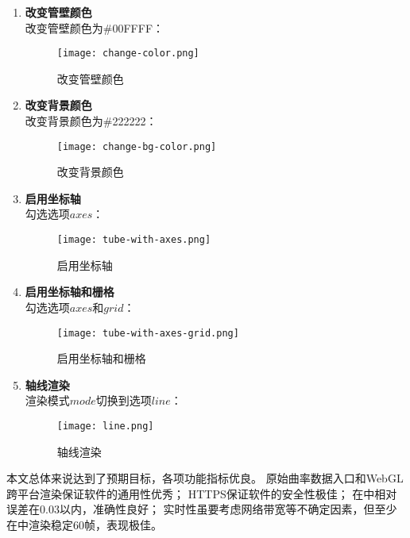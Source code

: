 \begin{enumerate}

\item \textbf{改变管壁颜色} \\
改变管壁颜色为\#00FFFF：
\begin{figure}[H]
\centering
\texttt{[image: change-color.png]}
\caption{改变管壁颜色}
\label{fig:change-color}
\end{figure}

\item \textbf{改变背景颜色} \\
改变背景颜色为\#222222：

\begin{figure}[H]
\centering
\texttt{[image: change-bg-color.png]}
\caption{改变背景颜色}
\label{fig:change-bg-color}
\end{figure}

\item \textbf{启用坐标轴} \\
勾选选项$axes$：

\begin{figure}[H]
\centering
\texttt{[image: tube-with-axes.png]}
\caption{启用坐标轴}
\label{fig:tube-with-axes}
\end{figure}

\item \textbf{启用坐标轴和栅格} \\
勾选选项$axes$和$grid$：

\begin{figure}[H]
\centering
\texttt{[image: tube-with-axes-grid.png]}
\caption{启用坐标轴和栅格}
\label{fig:tube-with-axes-grid}
\end{figure}

\item \textbf{轴线渲染} \\
渲染模式$mode$切换到选项$line$：

\begin{figure}[H]
\centering
\texttt{[image: line.png]}
\caption{轴线渲染}
\label{fig:line}
\end{figure}

\end{enumerate}

\clearpage

本文总体来说达到了预期目标，各项功能指标优良。
原始曲率数据入口和WebGL跨平台渲染保证软件的通用性优秀；
HTTPS保证软件的安全性极佳；
在中相对误差在$0.03$以内，准确性良好；
实时性虽要考虑网络带宽等不确定因素，但至少在中渲染稳定60帧，表现极佳。

